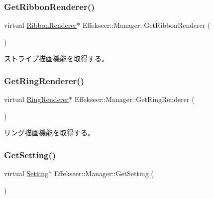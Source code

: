 \subsubsection{\texorpdfstring{Get\+Ribbon\+Renderer()}{GetRibbonRenderer()}}
{\footnotesize\ttfamily virtual \mbox{\hyperlink{class_effekseer_1_1_ribbon_renderer}{Ribbon\+Renderer}}$\ast$ Effekseer\+::\+Manager\+::\+Get\+Ribbon\+Renderer (\begin{DoxyParamCaption}{ }\end{DoxyParamCaption})\hspace{0.3cm}{\ttfamily [pure virtual]}}



ストライプ描画機能を取得する。 

\mbox{\label{class_effekseer_1_1_manager_a20dcb7324f1b4137cbcd872cfd90def2}} 
\subsubsection{\texorpdfstring{Get\+Ring\+Renderer()}{GetRingRenderer()}}
{\footnotesize\ttfamily virtual \mbox{\hyperlink{class_effekseer_1_1_ring_renderer}{Ring\+Renderer}}$\ast$ Effekseer\+::\+Manager\+::\+Get\+Ring\+Renderer (\begin{DoxyParamCaption}{ }\end{DoxyParamCaption})\hspace{0.3cm}{\ttfamily [pure virtual]}}



リング描画機能を取得する。 

\mbox{\label{class_effekseer_1_1_manager_ac32fce48f01429c6274b6237b61ec47d}} 
\subsubsection{\texorpdfstring{Get\+Setting()}{GetSetting()}}
{\footnotesize\ttfamily virtual \mbox{\hyperlink{class_effekseer_1_1_setting}{Setting}}$\ast$ Effekseer\+::\+Manager\+::\+Get\+Setting (\begin{DoxyParamCaption}{ }\end{DoxyParamCaption})\hspace{0.3cm}{\ttfamily [pure virtual]}}



